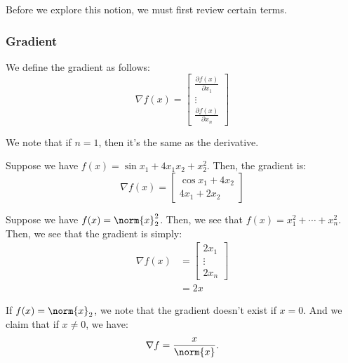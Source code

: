 \documentclass[openany]{book}
\begin{document}
Before we explore this notion, we must first review certain terms.

\subsubsection{Gradient}
\begin{defn}[Gradient]
	We define the gradient as follows:
	\begin{equation*}
		\nabla f(x) = \begin{bmatrix}
			\frac{\partial f(x)}{\partial x_1} \\
			\vdots \\
			\frac{\partial f(x)}{\partial x_n}
		\end{bmatrix}
	\end{equation*}

	We note that if $n = 1$, then it's the same as the derivative.
\end{defn}

\begin{example}
	Suppose we have $f(x) = \sin x_1 + 4x_1x_2 + x_2^{2}$. Then, the gradient is:
	\begin{equation*}
		\nabla f(x) = \begin{bmatrix}
			\cos x_1 + 4x_2 \\
			4x_1 + 2x_2
		\end{bmatrix}
	\end{equation*}
\end{example}

\begin{example}
	Suppose we have $f(x) = \norm{x}_2^{2}$. Then, we see that $f(x) = x_1^{2} + \cdots + x_n^{2}$. Then, we see that the gradient is simply:
	\begin{align*}
		\nabla f(x) &= \begin{bmatrix}
			2x_1 \\
			\vdots \\
			2x_n
		\end{bmatrix} \\
		&= 2x
	\end{align*}
\end{example}

\begin{example}
	If $f(x) = \norm{x}_2$, we note that the gradient doesn't exist if $x = 0$. And we claim that if $x \neq 0$, we have:
	\begin{equation*}
		\nabla f = \frac{x}{\norm{x}}.
	\end{equation*}
\end{example}
\end{document}
